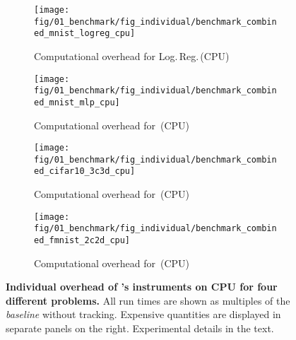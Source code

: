 \captionsetup[subfigure]{justification=justified,singlelinecheck=false}

\begin{figure}[p]
	\vfill
	\begin{subfigure}[t]{0.99\textwidth}
		\caption{\qquad Computational overhead for \mnist Log.\,Reg.\,(CPU)}
		\texttt{[image: fig/01\_benchmark/fig\_individual/benchmark\_combined\_mnist\_logreg\_cpu]}
		\label{fig:app_benchmark_instruments_cpu-mnist_logreg}
		\vspace{0.5cm}
	\end{subfigure}
	\vfill
	\begin{subfigure}[t]{0.99\textwidth}
		\caption{\qquad Computational overhead for \mnist \mlp\,(CPU)}
		\texttt{[image: fig/01\_benchmark/fig\_individual/benchmark\_combined\_mnist\_mlp\_cpu]}
		\label{fig:app_benchmark_instruments_cpu-mnist_mlp}
		\vspace{0.5cm}
	\end{subfigure}
	\vfill
	\begin{subfigure}[t]{0.99\textwidth}
		\caption{\qquad Computational overhead for \cifarten \threecthreed\,(CPU)}
		\texttt{[image: fig/01\_benchmark/fig\_individual/benchmark\_combined\_cifar10\_3c3d\_cpu]}
		\label{fig:app_benchmark_instruments_cpu-cifar10}
		\vspace{0.5cm}
	\end{subfigure}
	\vfill
	\begin{subfigure}[t]{0.99\textwidth}
		\caption{\qquad Computational overhead for \fmnist \twoctwod\,(CPU)}
		\texttt{[image: fig/01\_benchmark/fig\_individual/benchmark\_combined\_fmnist\_2c2d\_cpu]}
		\label{fig:app_benchmark_instruments_cpu-fmnist}
		\vspace{0.5cm}
	\end{subfigure}
	\vfill
	\caption{\textbf{Individual overhead of \cockpittitle's instruments on CPU for
			four different problems.} All run times are shown as multiples of
		the \emph{baseline} without tracking. Expensive quantities are displayed in
		separate panels on the right. Experimental details in the text.}
	\label{fig:app_benchmark_instruments_cpu}
\end{figure}

\captionsetup[subfigure]{justification=centering, singlelinecheck=true}


